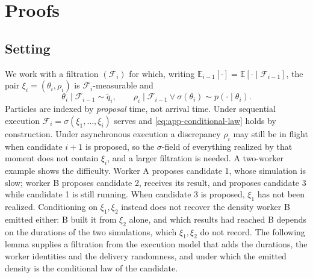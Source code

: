\documentclass[10pt]{article}
\theoremstyle{plain}
\theoremstyle{definition}
\begin{document}
\section{Proofs}\label{app:theory}

\subsection{Setting}\label{app:theory-setting}
We work with a filtration $(\mathcal{F}_i)$ for which, writing $\mathbb{E}_{i-1}[\cdot]=\mathbb{E}[\cdot\mid\mathcal{F}_{i-1}]$, the pair $\xi_i=(\theta_i,\rho_i)$ is $\mathcal{F}_i$-measurable and
\begin{equation}
\theta_i\mid\mathcal{F}_{i-1}\sim \tilde q_i,
\qquad
\rho_i\mid\mathcal{F}_{i-1}\vee\sigma(\theta_i)\sim p(\cdot\mid\theta_i).
\label{eq:app-conditional-law}
\end{equation}
Particles are indexed by \emph{proposal} time, not arrival time. Under sequential execution $\mathcal{F}_i=\sigma(\xi_1,\dots,\xi_i)$ serves and \eqref{eq:app-conditional-law} holds by construction. Under asynchronous execution a discrepancy $\rho_i$ may still be in flight when candidate $i+1$ is proposed, so the $\sigma$-field of everything realized by that moment does not contain $\xi_i$, and a larger filtration is needed. A two-worker example shows the difficulty. Worker A proposes candidate 1, whose simulation is slow; worker B proposes candidate 2, receives its result, and proposes candidate 3 while candidate 1 is still running. When candidate 3 is proposed, $\xi_1$ has not been realized. Conditioning on $\xi_1,\xi_2$ instead does not recover the density worker B emitted either: B built it from $\xi_2$ alone, and which results had reached B depends on the durations of the two simulations, which $\xi_1,\xi_2$ do not record. The following lemma supplies a filtration from the execution model that adds the durations, the worker identities and the delivery randomness, and under which the emitted density is the conditional law of the candidate.
\end{document}
